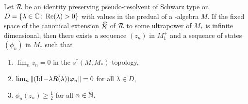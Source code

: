 \begin{lemma}\label{lem:d4-4.3}
Let $ \mathcal{R} $  be an identity preserving pseudo-resolvent of Schwarz type on $ D = \{\lambda \in \mathbb{C} \colon  \mathop{}\!\mathrm{Re}(\lambda) > 0\} $  with values in the predual of a \WA-algebra $ M $.
If the fixed space of the canonical extension $ \widehat{\mathcal{R}} $  of\/ $ \mathcal{R} $  to some ultrapower of\/ $ M_{*} $  is infinite dimensional, then there exists a sequence $ (z_{n}) $  in $ M_{1}^{+} $  and a sequence of states $ (\phi_{n}) $  in $ M_{*} $  such that
\begin{enumerate}[\upshape (i)]

\item\label{item:d4-4.3-i}
$ \lim_{n} z_{n} = 0 $  in the $ s^{*}(M,M_{*}) $-topology,

\item\label{item:d4-4.3-ii}
$ \lim_{n} \|(\Id - \lambda R(\lambda))\phi_{n}\| = 0 $  for all $ \lambda \in D $,

\item\label{item:d4-4.3-iii}
$ \phi_{n}(z_{n}) \geq \frac{1}{2} $  for all $ n \in \mathbb{N} $. 
\end{enumerate}
\end{lemma}
